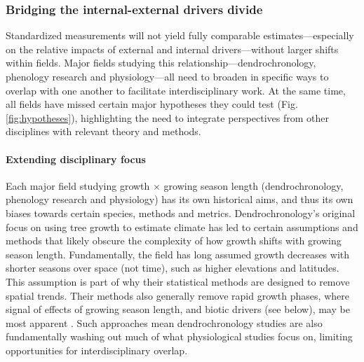 \documentclass[11pt]{article}
\begin{document}
\subsubsection*{Bridging the internal-external drivers divide}

Standardized measurements will not yield fully comparable estimates---especially on the relative impacts of external and internal drivers---without larger shifts within fields. Major fields studying this relationship---dendrochronology, phenology research and physiology---all need to broaden in specific ways to overlap with one another to facilitate interdisciplinary work. At the same time, all fields have missed certain major hypotheses they could test (Fig. \ref{fig:hypotheses}), highlighting the need to integrate perspectives from other disciplines with relevant theory and methods. 

\paragraph{Extending disciplinary focus} 

Each major field studying growth $\times$ growing season length (dendrochronology, phenology research and physiology) has its own historical aims, and thus its own biases towards certain species, methods and metrics. Dendrochronology's original focus on using tree growth to estimate climate has led to certain assumptions and methods  that likely obscure the complexity of how growth shifts with growing season length. Fundamentally, the field has long assumed growth decreases with shorter seasons \citep[e.g.,][]{bruening2017} over space (not time), such as higher elevations and latitudes. This assumption is part of why their statistical methods are designed to remove spatial trends. Their methods also generally remove rapid growth phases, where signal of effects of growing season length, and biotic drivers (see below), may be most apparent \citep{manzanedo2019towards}. Such approaches mean dendrochronology studies are also fundamentally washing out much of what physiological studies focus on, limiting opportunities for interdisciplinary overlap. %
\end{document}
